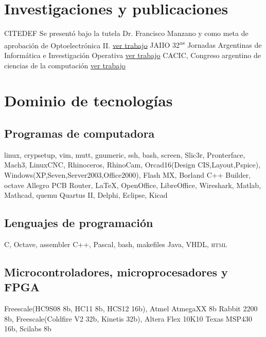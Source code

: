 \documentclass[11pt,a4paper,sans]{moderncv} 	%
\begin{document}
\section{Investigaciones y publicaciones}
 						{CITEDEF} 											{}{}{Se presentó bajo la tutela Dr. Francisco Manzano y como meta de aprobación de Optoelectrónica II. 	\href{http://disenioconingenio.com.ar/shop/docs/citedef_2008.pdf} 	{ver trabajo}}
 	{JAIIO 32\textsuperscript{as} Jornadas Argentinas de Informática e Investigación Operativa} 														{\href{http://disenioconingenio.com.ar/shop/docs/jaiio2003.pdf} 	{ver trabajo}} {}{}
 				{CACIC, Congreso argentino de ciencias de la computación} 					 													{\href{http://disenioconingenio.com.ar/shop/docs/cacic2003.pdf} 	{ver trabajo}} {}{}
\section{Dominio de tecnologías}
	\subsection{Programas de computadora}
	 	{linux, crypsetup, vim, mutt, gnumeric, ssh, bash, screen, Slic3r, Pronterface, Mach3, LinuxCNC, Rhinoceros, RhinoCam, Orcad16(Design CIS,Layout,Pspice), Windows(XP,Seven,Server2003,Office2000), Flash MX, Borland C++ Builder, octave}
	 	{Allegro PCB Router, \LaTeX, OpenOffice, LibreOffice, Wireshark, Matlab, Mathcad, quemu}
	 	{Quartus II, Delphi, Eclipse, Kicad}

	\subsection{Lenguajes de programación}
	 	{C, Octave, assembler}
	 	{C++, Pascal, bash, makefiles}
	 	{Java, VHDL, \textsc{html}}

	\subsection{Microcontroladores, microprocesadores y FPGA}
	 	{Freescale(HC9S08 8b, HC11 8b, HCS12 16b), Atmel AtmegaXX 8b}
	 	{Rabbit 2200 8b, Freescale(Coldfire V2 32b, Kinetis 32b), Altera Flex 10K10}
	 	{Texas MSP430 16b, Scilabs 8b}
\end{document}
